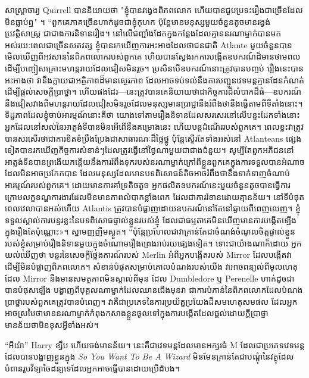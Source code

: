 សាស្ត្រាចារ្យ Quirrell បាននិយាយថា "ខ្ញុំបានវង្វេងពិភពលោក ហើយបានជួបប្រទះរឿងជាច្រើនដែលមិនធ្លាប់ឮ" ។ “ពួកគេភាគច្រើនហាក់ដូចជាខ្ញុំកុហក ប៉ុន្តែមានមនុស្សមួយចំនួនតូចមានរង្វង់ប្រវត្តិសាស្ត្រ ជាជាងការនិទានរឿង។ នៅលើជញ្ជាំងដែកក្នុងកន្លែងដែលគ្មាននរណាម្នាក់បានមកអស់រយៈពេលជាច្រើនសតវត្ស ខ្ញុំបានរកឃើញការអះអាងដែលថាជនជាតិ Atlante មួយចំនួនបានមើលឃើញពីអវសាននៃពិភពលោករបស់ពួកគេ ហើយបានស្វែងរកការបង្កើតឧបករណ៍ដ៏មានថាមពលដើម្បីបញ្ចៀសគ្រោះមហន្តរាយដែលជៀសមិនរួច។ ប្រសិនបើឧបករណ៍នោះត្រូវបានបញ្ចប់ រឿងនេះបានអះអាងថា វានឹងក្លាយជាអត្ថិភាពដ៏មានស្ថេរភាព ដែលអាចទប់ទល់នឹងការបញ្ជូនវេទមន្តគ្មានដែនកំណត់ ដើម្បីផ្តល់សេចក្តីប្រាថ្នា។ ហើយ​ផងដែរ—នេះ​ត្រូវ​បាន​គេ​និយាយ​ថា​ជា​កិច្ចការ​ដ៏​លំបាក​ដ៏​ធំ—ឧបករណ៍​នឹង​ជៀស​វាង​ពី​មហន្តរាយ​ដែល​ជៀស​មិន​រួច​ដែល​មនុស្ស​មាន​ប្រាជ្ញា​នឹង​រំពឹង​ថា​នឹង​ធ្វើ​តាម​ពី​ទីតាំង​នោះ។ ទិដ្ឋភាពដែលខ្ញុំចាប់អារម្មណ៍នោះគឺថា យោងទៅតាមរឿងនិទានដែលសរសេរនៅលើបន្ទះដែកទាំងនោះ អ្នកដែលនៅសល់នៃអាត្លង់ទីបានមិនអើពើនឹងគម្រោងនេះ ហើយបន្តដំណើររបស់ពួកគេ។ ពេលខ្លះវាត្រូវបានសរសើរថាជាការខិតខំប្រឹងប្រែងជាសាធារណៈដ៏ថ្លៃថ្នូ ប៉ុន្តែស្ទើរតែទាំងអស់នៅ Atlanteans ផ្សេងទៀតបានរកឃើញកិច្ចការសំខាន់ៗដែលត្រូវធ្វើនៅថ្ងៃណាមួយជាជាងជំនួយ។ សូម្បីតែពួកអភិជននៅអាត្លង់ទីនបានព្រងើយកន្តើយនឹងការរំពឹងទុករបស់នរណាម្នាក់ក្រៅពីខ្លួនពួកគេក្នុងការទទួលបានអំណាចដែលមិនអាចប្រកែកបាន ដែលមនុស្សដែលមានបទពិសោធន៍តិចអាចរំពឹងថានឹងទាក់ទាញចំណាប់អារម្មណ៍របស់ពួកគេ។ ដោយមានការគាំទ្រតិចតួច អ្នកផលិតឧបករណ៍នេះមួយចំនួនតូចបានធ្វើការក្រោមលក្ខខណ្ឌការងារដែលមិនមានភាពលំបាកខ្លាំងពេក ដែលជាការរំខានដោយគ្មានន័យ។ នៅទីបំផុតពេលវេលាបានអស់ហើយ Atlantis ត្រូវបានបំផ្លាញដោយឧបករណ៍នៅតែនៅឆ្ងាយពីពេញលេញ។ ខ្ញុំ​ទទួល​ស្គាល់​ការ​បន្ទរ​ខ្លះ​នៃ​បទ​ពិសោធ​ផ្ទាល់​ខ្លួន​របស់​ខ្ញុំ ដែល​ជា​ធម្មតា​គេ​មិន​ឃើញ​មាន​ការ​បង្កើត​ឡើង​ក្នុង​រឿង​តែ​ប៉ុណ្ណោះ»។ ស្នាមញញឹមស្ងួត។ “ប៉ុន្តែប្រហែលជាវាគ្រាន់តែជាចំណង់ចំណូលចិត្តផ្ទាល់ខ្លួនរបស់ខ្ញុំសម្រាប់រឿងនិទានមួយក្នុងចំណោមរឿងព្រេងរាប់រយផ្សេងទៀត។ ទោះជាយ៉ាងណាក៏ដោយ អ្នកយល់ឃើញថា បន្ទរនៃសេចក្តីថ្លែងការណ៍របស់ Merlin អំពីអ្នកបង្កើតរបស់ Mirror ដែលបង្កើតវាដើម្បីមិនបំផ្លាញពិភពលោក។ សំខាន់បំផុតសម្រាប់គោលបំណងរបស់យើង វាអាចពន្យល់ពីមូលហេតុដែល Mirror នឹងមានសមត្ថភាពមិនស្គាល់ពីមុន ដែល Dumbledore ឬ Perenelle ហាក់ដូចជាបានបំផុសឡើង បង្ហាញពីបុគ្គលណាម្នាក់ដែលឈានជើងមុនវា ជាការបំភាន់នៃពិភពលោកដែលបំណងប្រាថ្នារបស់ពួកគេត្រូវបានបំពេញ។ វាគឺជាប្រភេទនៃការប្រយ័ត្នប្រយែងដ៏សមហេតុសមផល ដែលអ្នកអាចស្រមៃថាមាននរណាម្នាក់កំពុងកសាងខ្លួនចូលទៅក្នុងការបង្កើតដែលផ្តល់ដោយក្តីប្រាថ្នា មានន័យថាមិនខុសអ្វីទាំងអស់។

“អីយ៉ា” Harry ខ្សឹប ហើយចង់មានន័យ។ នេះគឺជាវេទមន្តដែលមានអក្សរធំ M ដែលជាប្រភេទវេទមន្តដែលបានបង្ហាញខ្លួនក្នុង \emph{So You Want To Be A Wizard} មិនមែនគ្រាន់តែជាបណ្តុំនៃវត្ថុដែលបំពានរូបវិទ្យាចៃដន្យទេដែលអ្នកអាចធ្វើបានដោយប្រើដំបង។

